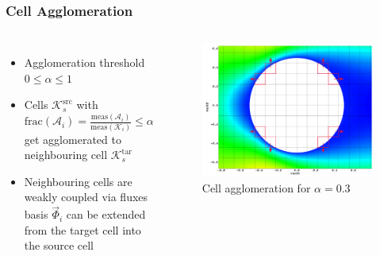 	\begin{frame}
		\frametitle{Cell Agglomeration}

		\begin{columns}[t]
			\column[]{5cm}
			\vspace{-0.5cm}
			\begin{itemize}
				\item Agglomeration threshold  $0 \leq \alpha \leq 1$
				\item Cells $\mathcal{K}_s^\text{src}$ with $\text{frac}(\mathcal{A}_i) = \tfrac{\text{meas}(\mathcal{A}_i)}{\text{meas}(\mathcal{K}_i)} \leq \alpha$ get agglomerated to neighbouring cell $\mathcal{K}_s^\text{tar}$
				\item Neighbouring cells are weakly coupled via fluxes \newline \MVRightArrow \, basis $\vec{\Phi}_i$ can be extended from the target cell into the source cell
			\end{itemize}
			\column[]{7cm}
			\begin{figure}[htbp]
				\vspace{-1cm}
				\includegraphics[width=\textwidth]{img/agglom.PNG}
				\caption{Cell agglomeration for $\alpha = 0.3$}
			\end{figure} 
		\end{columns}
	\end{frame}